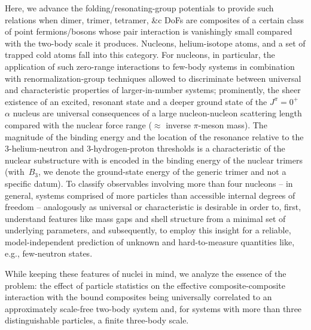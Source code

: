 \documentclass[preprint,aps,onecolumn,preprintnumbers,amsmath,amssymb,nofootinbib,superscriptaddress]{revtex4-1}
\newcommand{\bt}{\ensuremath{B_3}}
\begin{document}
Here, we advance the folding/resonating-group potentials to provide such relations when dimer, trimer, tetramer, \&c DoFs
are composites of a certain class of point fermions/bosons whose pair interaction is vanishingly small compared with the
two-body scale it produces. Nucleons, helium-isotope atoms, and a set of trapped cold atoms fall into this category. For nucleons,
in particular, the application of such zero-range interactions to few-body systems in combination with renormalization-group techniques
allowed to discriminate between universal and characteristic properties of larger-in-number systems; prominently, the 
sheer existence of an excited, resonant state and a deeper ground state of the $J^\pi=0^+$ $\alpha$ nucleus are universal
consequences of a large nucleon-nucleon scattering length compared with the nuclear force range ($\approx$ inverse $\pi$-meson mass).
The magnitude of the binding energy and the location of the resonance relative to the 3-helium-neutron and 3-hydrogen-proton thresholds
is a characteristic of the nuclear substructure with is encoded in the binding energy of the nuclear trimers (with~\bt, we denote the
ground-state energy of the generic trimer and not a specific datum).
To classify observables involving more than four nucleons -- in general, systems comprised of more particles than accessible internal
degrees of freedom -- analogously as universal or characteristic is desirable in order to, first, understand features like mass gaps
and shell structure from a minimal set of underlying parameters, and subsequently, to employ this insight for a reliable, model-independent
prediction of unknown and hard-to-measure quantities like, e.g., few-neutron states.

While keeping these features of nuclei in mind, we analyze the essence of the problem: the effect of particle statistics on the effective
composite-composite interaction with the bound composites being universally correlated to an approximately scale-free two-body system and,
for systems with more than three distinguishable particles, a finite three-body scale. 
\end{document}
